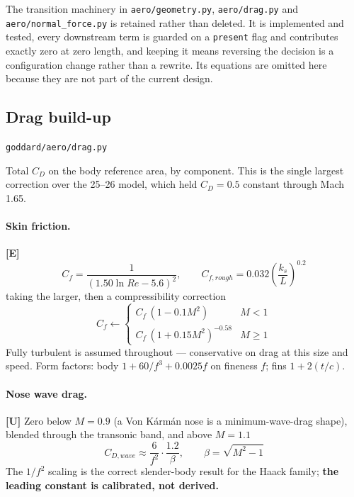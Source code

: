 \documentclass[11pt,a4paper]{article}
\newcommand{\established}{\textcolor{okgreen}{\textbf{[E]}}\xspace}
\newcommand{\unvalidated}{\textcolor{danger}{\textbf{[U]}}\xspace}
\newcommand{\src}[1]{\hfill{\footnotesize\texttt{#1}}}
\begin{document}
The transition machinery in \texttt{aero/geometry.py},
\texttt{aero/drag.py} and \texttt{aero/normal\_force.py} is retained rather
than deleted. It is implemented and tested, every downstream term is guarded on
a \texttt{present} flag and contributes exactly zero at zero length, and
keeping it means reversing the decision is a configuration change rather than a
rewrite. Its equations are omitted here because they are not part of the
current design.

\subsection{Drag build-up}
\src{goddard/aero/drag.py}

Total $C_D$ on the body reference area, by component. This is the single
largest correction over the 25--26 model, which held $C_D = 0.5$ constant
through Mach 1.65.

\paragraph{Skin friction.} \established
\begin{equation}
C_f = \frac{1}{\left(1.50\ln Re - 5.6\right)^2},
\qquad
C_{f,rough} = 0.032\left(\frac{k_s}{L}\right)^{0.2}
\end{equation}
taking the larger, then a compressibility correction
\begin{equation}
C_f \leftarrow
\begin{cases}
C_f\,(1 - 0.1 M^2) & M < 1 \\
C_f\,(1 + 0.15 M^2)^{-0.58} & M \geq 1
\end{cases}
\end{equation}
Fully turbulent is assumed throughout --- conservative on drag at this size and
speed. Form factors: body $1 + 60/f^3 + 0.0025 f$ on fineness $f$; fins
$1 + 2(t/c)$.

\paragraph{Nose wave drag.} \unvalidated
Zero below $M = 0.9$ (a Von K\'arm\'an nose is a minimum-wave-drag shape),
blended through the transonic band, and above $M=1.1$
\begin{equation}
C_{D,wave} \approx \frac{6}{f^2}\cdot\frac{1.2}{\beta},
\qquad \beta = \sqrt{M^2-1}
\end{equation}
The $1/f^2$ scaling is the correct slender-body result for the Haack family;
\textbf{the leading constant is calibrated, not derived.}
\end{document}
